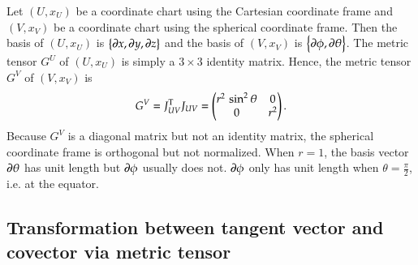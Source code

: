 \documentclass[11pt, a4paper]{book}
\begin{document}
\begin{Example}
  \label{exam:spherical-coordinate-metric-tensor}
  Let $(U,x_U)$ be a coordinate chart using the Cartesian coordinate frame and $(V,x_V)$
  be a coordinate chart using the spherical coordinate frame. Then the basis of $(U,x_U)$
  is $\left\{ \boldsymbol{\partial}x, \boldsymbol{\partial}y, \boldsymbol{\partial}z \right\}$ and the basis of
  $(V,x_V)$ is $\left\{ \boldsymbol{\partial}\phi, \boldsymbol{\partial}\theta \right\}$. The metric
  tensor $G^U$ of $(U,x_U)$ is simply a $3\times 3$ identity matrix. Hence, the metric
  tensor $G^V$ of $(V,x_V)$ is
  \begin{equation}
    \label{eq:spherical-coordinate-metric-tensor}
    G^V = J_{UV}^{\mathrm{T}} J_{UV} = \ifx\endpmatrix\undefined\pmatrix{\else\begin{pmatrix}\fi r^2\,
        \sin ^2\theta&0\cr 0&r^2\cr 
        \ifx\endpmatrix\undefined}\else\end{pmatrix}\fi.
  \end{equation}
  Because $G^V$ is a diagonal matrix but not an identity matrix, the spherical coordinate
  frame is orthogonal but not normalized. When $r=1$, the basis vector
  $\boldsymbol{\partial}\theta$ has unit length but $\boldsymbol{\partial}\phi$ usually does not.
  $\boldsymbol{\partial}\phi$ only has unit length when $\theta=\frac{\pi}{2}$, i.e. at the
  equator.
\end{Example}

\subsection{Transformation between tangent vector and covector via metric tensor}
\end{document}
